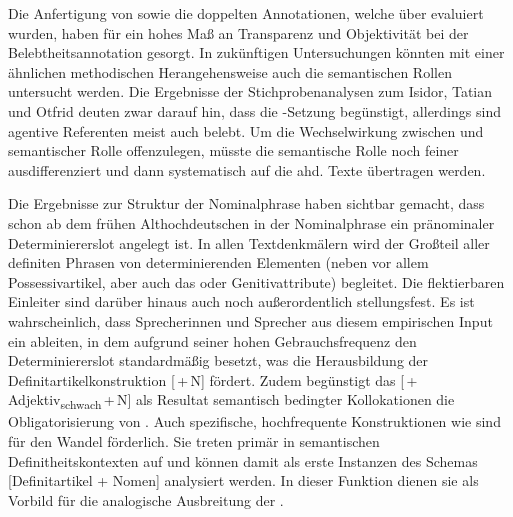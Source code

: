 Die Anfertigung von  \parencite[dokumentiert in][]{HZKYL4_2020} sowie die doppelten  Annotationen, welche über  evaluiert wurden, haben für ein hohes Maß an Transparenz und Objektivität  bei der   Belebtheitsannotation  gesorgt. In zukünftigen Untersuchungen könnten mit einer ähnlichen methodischen Herangehensweise auch die semantischen Rollen  untersucht werden. Die Ergebnisse der Stichprobenanalysen zum Isidor, Tatian und Otfrid deuten zwar darauf hin, dass  die -Setzung begünstigt, allerdings sind agentive Referenten meist auch belebt. Um die Wechselwirkung zwischen  und semantischer Rolle  offenzulegen, müsste die semantische Rolle noch feiner ausdifferenziert und dann systematisch auf die ahd. Texte übertragen werden. 

Die Ergebnisse zur Struktur  der  Nominalphrase haben sichtbar gemacht, dass schon ab dem frühen Althochdeutschen in der Nominalphrase ein pränominaler  Determiniererslot  angelegt ist. In allen Textdenkmälern wird der Großteil aller definiten Phrasen von determinierenden Elementen (neben  vor allem  Possessivartikel, aber auch das   oder  Genitivattribute) begleitet. Die flektierbaren  Einleiter sind darüber hinaus auch noch außerordentlich stellungsfest. Es ist wahrscheinlich, dass Sprecherinnen und Sprecher aus diesem empirischen Input ein  ableiten, in dem  aufgrund seiner hohen Gebrauchsfrequenz den Determiniererslot standardmäßig besetzt, was die Herausbildung  der Definitartikelkonstruktion  [\,+\,N] fördert. Zudem begünstigt das   [\,+\,Adjektiv\textsubscript{schwach}\,+\,N] als Resultat semantisch bedingter Kollokationen die Obligatorisierung von . Auch spezifische, hochfrequente Konstruktionen  wie  sind für den Wandel förderlich. Sie treten primär in semantischen  Definitheitskontexten  auf und können damit als erste Instanzen des Schemas  [Definitartikel + Nomen] analysiert werden. In dieser Funktion dienen sie als Vorbild für die analogische  Ausbreitung der . 






